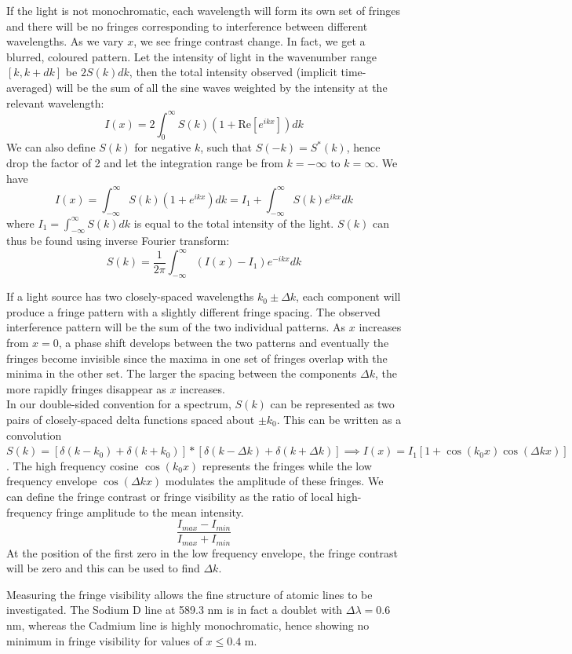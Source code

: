 \documentclass[a4paper]{article}
\begin{document}
\begin{Note}
If the light is not monochromatic, each wavelength will form its own set of fringes and there will be no fringes corresponding to interference between different wavelengths. As we vary $x$, we see fringe contrast change. In fact, we get a blurred, coloured pattern. Let the intensity of light in the wavenumber range $[k,k+dk]$ be $2S(k)dk$, then the total intensity observed (implicit time-averaged) will be the sum of all the sine waves weighted by the intensity at the relevant wavelength:
$$I(x)=2\int_0^\infty S(k)(1+\text{Re}[e^{ikx}])dk$$
We can also define $S(k)$ for negative $k$, such that $S(-k)=S^*(k)$, hence drop the factor of 2 and let the integration range be from $k=-\infty$ to $k=\infty$. We have
$$I(x)=\int_{-\infty}^\infty S(k)(1+e^{ikx})dk=I_1+\int_{-\infty}^\infty S(k)e^{ikx}dk$$
where $I_1=\int_{-\infty}^\infty S(k)dk$ is equal to the total intensity of the light. $S(k)$ can thus be found using inverse Fourier transform:
$$S(k)=\frac{1}{2\pi}\int_{-\infty}^\infty(I(x)-I_1)e^{-ikx}dk$$
\end{Note}
\begin{Note}
If a light source has two closely-spaced wavelengths $k_0\pm\Delta k$, each component will produce a fringe pattern with a slightly different fringe spacing. The observed interference pattern will be the sum of the two individual patterns. As $x$ increases from $x=0$, a phase shift develops between the two patterns and eventually the fringes become invisible since the maxima in one set of fringes overlap with the minima in the other set. The larger the spacing between the components $\Delta k$, the more rapidly fringes disappear as $x$ increases.\\[5pt]
In our double-sided convention for a spectrum, $S(k)$ can be represented as two pairs of closely-spaced delta functions spaced about $\pm k_0$. This can be written as a convolution $S(k)=[\delta(k-k_0)+\delta(k+k_0)]*[\delta(k-\Delta k)+\delta(k+\Delta k)]\implies I(x)=I_1[1+\cos(k_0x)\cos(\Delta kx)]$. The high frequency cosine $\cos(k_0x)$ represents the fringes while the low frequency envelope $\cos(\Delta kx)$ modulates the amplitude of these fringes. We can define the fringe contrast or fringe visibility as the ratio of local high-frequency fringe amplitude to the mean intensity.
$$\frac{I_{max}-I_{min}}{I_{max}+I_{min}}$$
At the position of the first zero in the low frequency envelope, the fringe contrast will be zero and this can be used to find $\Delta k$.
\end{Note}
\begin{eg}
Measuring the fringe visibility allows the fine structure of atomic lines to be investigated. The Sodium D line at 589.3 nm is in fact a doublet with $\Delta\lambda=0.6$ nm, whereas the Cadmium line is highly monochromatic, hence showing no minimum in fringe visibility for values of $x\leq 0.4$ m.
\end{eg}
\end{document}
